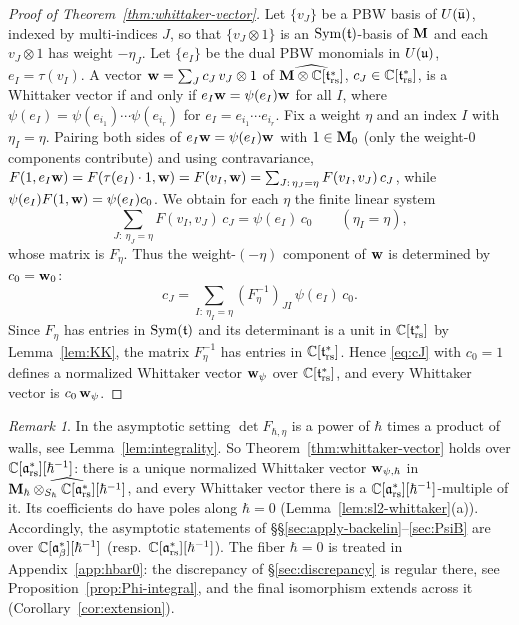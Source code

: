 \documentclass{article}
\theoremstyle{plain}
\theoremstyle{definition}
\theoremstyle{remark}
\newtheorem{remark}[theorem]{Remark}
\numberwithin{equation}{section}
\begin{document}
\begin{proof}[Proof of Theorem~\ref{thm:whittaker-vector}]
Let $\{v_J\}$ be a PBW basis of $U(\bar{\mathfrak{u}})$, indexed by multi-indices $J$, so that $\{v_J\otimes1\}$ is an $\operatorname{Sym}(\mathfrak{t})$-basis of $\mathbf{M}$ and each $v_J\otimes1$ has weight $-\eta_J$. Let $\{e_I\}$ be the dual PBW monomials in $U(\mathfrak{u})$, $e_I=\tau(v_I)$. A vector $\mathbf w=\sum_Jc_J\,v_J\otimes1$ of $\widehat{\mathbf{M}\otimes\mathbb{C}[\mathfrak{t}^*_{\mathrm{rs}}]}$, $c_J\in\mathbb{C}[\mathfrak{t}^*_{\mathrm{rs}}]$, is a Whittaker vector if and only if $e_I\mathbf w=\psi(e_I)\mathbf w$ for all $I$, where $\psi(e_I)=\psi(e_{i_1})\cdots\psi(e_{i_r})$ for $e_I=e_{i_1}\cdots e_{i_r}$. Fix a weight $\eta$ and an index $I$ with $\eta_I=\eta$. Pairing both sides of $e_I\mathbf w=\psi(e_I)\mathbf w$ with $1\in\mathbf{M}_0$ (only the weight-$0$ components contribute) and using contravariance, $F(1,e_I\mathbf w)=F(\tau(e_I)\cdot1,\mathbf w)=F(v_I,\mathbf w)=\sum_{J:\,\eta_J=\eta}F(v_I,v_J)\,c_J$, while $\psi(e_I)F(1,\mathbf w)=\psi(e_I)c_0$. We obtain for each $\eta$ the finite linear system
\[
\sum_{J:\ \eta_J=\eta}F(v_I,v_J)\,c_J=\psi(e_I)\,c_0\qquad(\eta_I=\eta),
\]
whose matrix is $F_\eta$. Thus the weight-$(-\eta)$ component of $\mathbf w$ is determined by $c_0=\mathbf w_0$:
\begin{equation}\label{eq:cJ}
c_J=\sum_{I:\ \eta_I=\eta}(F_\eta^{-1})_{JI}\,\psi(e_I)\,c_0 .
\end{equation}
Since $F_\eta$ has entries in $\operatorname{Sym}(\mathfrak{t})$ and its determinant is a unit in $\mathbb{C}[\mathfrak{t}^*_{\mathrm{rs}}]$ by Lemma~\ref{lem:KK}, the matrix $F_\eta^{-1}$ has entries in $\mathbb{C}[\mathfrak{t}^*_{\mathrm{rs}}]$. Hence \eqref{eq:cJ} with $c_0=1$ defines a normalized Whittaker vector $\mathbf w_\psi$ over $\mathbb{C}[\mathfrak{t}^*_{\mathrm{rs}}]$, and every Whittaker vector is $c_0\,\mathbf w_\psi$.
\end{proof}

\begin{remark}\label{rem:KK-asymptotic}
In the asymptotic setting $\det F_{\hbar,\eta}$ is a power of $\hbar$ times a product of walls, see Lemma~\ref{lem:integrality}. So Theorem~\ref{thm:whittaker-vector} holds over $\mathbb{C}[\mathfrak{a}^*_{\mathrm{rs}}][\hbar^{-1}]$: there is a unique normalized Whittaker vector $\mathbf w_{\psi,\hbar}$ in $\widehat{\mathbf{M}_\hbar\otimes_{S_\hbar}\mathbb{C}[\mathfrak{a}^*_{\mathrm{rs}}][\hbar^{-1}]}$, and every Whittaker vector there is a $\mathbb{C}[\mathfrak{a}^*_{\mathrm{rs}}][\hbar^{-1}]$-multiple of it. Its coefficients do have poles along $\hbar=0$ (Lemma~\ref{lem:sl2-whittaker}(a)). Accordingly, the asymptotic statements of \S\S\ref{sec:apply-backelin}--\ref{sec:PsiB} are over $\mathbb{C}[\mathfrak{a}^*_{\beta}][\hbar^{-1}]$ (resp.\ $\mathbb{C}[\mathfrak{a}^*_{\mathrm{rs}}][\hbar^{-1}]$). The fiber $\hbar=0$ is treated in Appendix~\ref{app:hbar0}: the discrepancy of \S\ref{sec:discrepancy} is regular there, see Proposition~\ref{prop:Phi-integral}, and the final isomorphism extends across it (Corollary~\ref{cor:extension}).
\end{remark}
\end{document}
